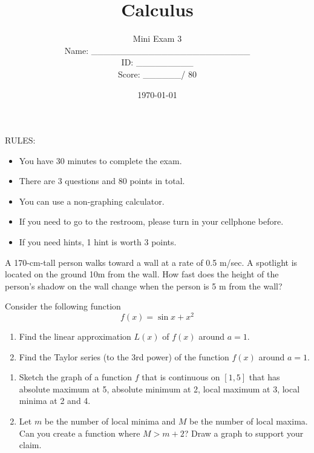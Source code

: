 \documentclass[12pt]{amsart}
\title{ Calculus }
\author{  Mini Exam 3  \\ \vspace{1cm} Name: \_\_\_\_\_\_\_\_\_\_\_\_\_\_\_\_\_\_\_\_\_\_\_\_\_  
\\ \vspace{1cm} ID: \_\_\_\_\_\_\_\_\_ \\ \vspace{1cm} Score: \_\_\_\_\_\_/ 80}
\date{\today}
\begin{document}
\maketitle


RULES:
\begin{itemize}
	\item You have 30 minutes to complete the exam.
	\item There are 3 questions and 80 points in total.
	\item You can use a non-graphing calculator.
	\item If you need to go to the restroom, please turn in your cellphone before.
	\item If you need hints, 1 hint is worth 3 points.
\end{itemize}

\newpage

\begin{problem}[20 points]
A 170-cm-tall person walks toward a wall at a rate of  0.5 m/sec.
A spotlight is located on the ground 10m from the wall.
How fast does the height of the person’s shadow on the wall change when the person is 5 m from the wall?
\end{problem}

\newpage

\begin{problem}[20 points]
Consider the following function
$$ f(x) = \sin x + x^2 $$
\begin{enumerate}
	\item Find the linear approximation $L(x)$ of $f(x)$ around $a = 1$.
	      \vspace{8cm}
	\item Find the Taylor series (to the 3rd power) of the function $f(x)$ around $a = 1$.
	      \vspace{8cm}
\end{enumerate}
\end{problem}

\newpage

\begin{problem}[20 points]
\begin{enumerate}
	\item Sketch the graph of a function $f$ that is continuous on $[1,5]$ that has absolute maximum at 5, absolute minimum at 2,   local maximum at 3, local minima at 2 and 4.
	      \vspace{8cm}
	\item Let $m$ be the number of local minima and  $M$ be the number of local maxima.
	      Can you create a function where  $M > m+ 2$? Draw a graph to support your claim.
\end{enumerate}
\end{problem}
\end{document}
